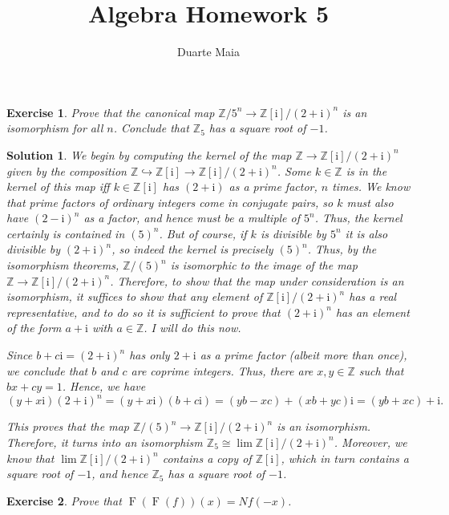 \documentclass{article}
\title{Algebra Homework 5}
\author{Duarte Maia}
\newtheorem{ex}{Exercise}
\theoremstyle{nonumberplain}
\newtheorem{sol}{Solution}
\newcommand{\Z}{\mathbb{Z}}
\newcommand{\I}{\mathrm{i}}
\DeclareMathOperator{\Fr}{F}
\begin{document}
\maketitle

\setcounter{ex}{28}

\begin{ex}
Prove that the canonical map $\Z/5^n \to \Z[\I]/(2+\I)^n$ is an isomorphism for all $n$. Conclude that $\Z_5$ has a square root of $-1$.
\end{ex}

\begin{sol}
We begin by computing the kernel of the map $\Z \to \Z[\I]/(2+\I)^n$ given by the composition $\Z \hookrightarrow \Z[\I] \rightarrow \Z[\I]/(2+\I)^n$. Some $k \in \Z$ is in the kernel of this map iff $k \in \Z[\I]$ has $(2+\I)$ as a prime factor, $n$ times. We know that prime factors of ordinary integers come in conjugate pairs, so $k$ must also have $(2-\I)^n$ as a factor, and hence must be a multiple of $5^n$. Thus, the kernel certainly is contained in $(5)^n$. But of course, if $k$ is divisible by $5^n$ it is also divisible by $(2+\I)^n$, so indeed the kernel is precisely $(5)^n$. Thus, by the isomorphism theorems, $\Z/(5)^n$ is isomorphic to the image of the map $\Z \to \Z[\I]/(2+\I)^n$. Therefore, to show that the map under consideration is an isomorphism, it suffices to show that any element of $\Z[\I]/(2+\I)^n$ has a real representative, and to do so it is sufficient to prove that $(2+\I)^n$ has an element of the form $a+\I$ with $a \in \Z$. I will do this now.

Since $b + c \I = (2+\I)^n$ has only $2+\I$ as a prime factor (albeit more than once), we conclude that $b$ and $c$ are coprime integers. Thus, there are $x, y \in \Z$ such that $bx + cy = 1$. Hence, we have
\begin{equation}
(y + x \I)(2+\I)^n = (y+x\I)(b+c\I) = (yb - xc) + (xb + yc)\I = (yb + xc) + \I.
\end{equation}

This proves that the map $\Z/(5)^n \to \Z[\I]/(2+\I)^n$ is an isomorphism. Therefore, it turns into an isomorphism $\Z_5 \cong \lim \Z[\I]/(2+\I)^n$. Moreover, we know that $\lim \Z[\I]/(2+\I)^n$ contains a copy of $\Z[\I]$, which in turn contains a square root of $-1$, and hence $\Z_5$ has a square root of $-1$.
\end{sol}

\begin{ex}
Prove that $\Fr(\Fr(f))(x) = N f(-x)$.
\end{ex}
\end{document}
